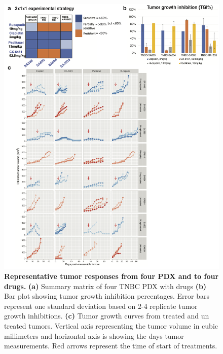 \begin{figure}
\centering
	\includegraphics[width=\textwidth]{Figures/chap3/4drugs4PDXNew.png}
	\caption[Representative tumor responses from four PDX and  to four drugs]
	{\small
	   \textbf{Representative tumor responses from four PDX and  to four drugs.}
	    \textbf{(a)} Summary matrix of four TNBC PDX with drugs
	     \textbf{(b)} Bar plot showing tumor growth inhibition percentages. Error bars represent one standard deviation based on 2-4 replicate tumor growth inhibitions.
	    \textbf{(c)} Tumor growth curves from treated and un treated tumors. Vertical axis representing the tumor volume in cubic millimeters and horizontal axis is showing the days tumor measurements. Red arrows represent the time of start of treatments.
}
	\label{fig:EstablishmentofPDX}
\end{figure}



